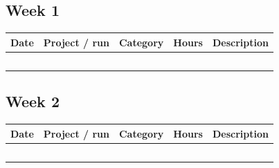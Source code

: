\documentclass[11pt]{article}
\begin{document}
\subsection{Week 1}
\vspace{0.3cm}
\begin{tabularx}{\textwidth}{|L{1.5cm}|L{2.4cm}|L{2.2cm}|C{1.4cm}|Y|}
\hline
{}\textbf{Date} & \textbf{Project / run} & \textbf{Category} & \textbf{Hours} & \textbf{Description} \\\hline
\rule{0pt}{0.75cm} & & & & \\\hline
\rule{0pt}{0.75cm} & & & & \\\hline
\rule{0pt}{0.75cm} & & & & \\\hline
\rule{0pt}{0.75cm} & & & & \\\hline
\rule{0pt}{0.75cm} & & & & \\\hline
\end{tabularx}

\subsection{Week 2}
\vspace{0.3cm}
\begin{tabularx}{\textwidth}{|L{1.5cm}|L{2.4cm}|L{2.2cm}|C{1.4cm}|Y|}
\hline
{}\textbf{Date} & \textbf{Project / run} & \textbf{Category} & \textbf{Hours} & \textbf{Description} \\\hline
\rule{0pt}{0.75cm} & & & & \\\hline
\rule{0pt}{0.75cm} & & & & \\\hline
\rule{0pt}{0.75cm} & & & & \\\hline
\rule{0pt}{0.75cm} & & & & \\\hline
\rule{0pt}{0.75cm} & & & & \\\hline
\end{tabularx}

\RDEndMatter
\end{document}
